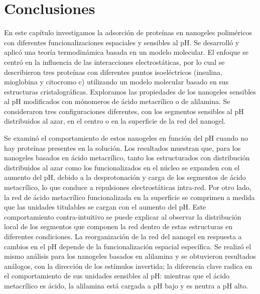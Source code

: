 \section{Conclusiones}


En este cap\'itulo investigamos la adsorci\'on de prote\'inas en nanogeles polim\'ericos con diferentes funcionalizaciones espaciales y sensibles al pH. Se desarroll\'o y aplic\'o una teor\'ia termodin\'amica basada en un modelo molecular.
El enfoque se centr\'o en la influencia de las interacciones electrost\'aticas, por lo cual se describieron tres prote\'inas con diferentes puntos isoel\'ectricos (insulina, mioglobina y citocromo c) utilizando un modelo molecular basado en sus estructuras cristalogr\'aficas.
Exploramos las propiedades de los nanogeles sensibles al pH modificados con m\'onomeros de  \'acido metacr\'ilico o de alilamina.
Se consideraron tres configuraciones diferentes, con los segmentos sensibles al pH distribuidos al azar, en el centro o en la superficie de la red del nanogel.

Se examin\'o el comportamiento de estos nanogeles en funci\'on del pH cuando no hay prote\'inas presentes en la soluci\'on.
Los resultados muestran que, para los nanogeles basados en \'acido metacr\'ilico, tanto los estructurados con distribuci\'on distribuidos al azar como los funcionalizados en el n\'ucleo se expanden con el aumento del pH, debido a la desprotonaci\'on y carga de los segmentos de \'acido metacr\'ilico, lo que conduce a repulsiones electrost\'aticas intra-red.
Por otro lado, la red de \'acido metacr\'ilico funcionalizada en la superficie se comprimen a medida que las unidades titulables se cargan con el aumento del pH.
Este comportamiento contra-intuitivo se puede explicar al observar la distribuci\'on local de los segmentos que componen la red dentro de estas estructuras en diferentes condiciones.
La reorganizaci\'on de la red del nanogel en respuesta a cambios en el pH depende de la funcionalizaci\'on espacial espec\'ifica.
Se realiz\'o el mismo an\'alisis para los nanogeles basados en alilamina y se obtuvieron resultados an\'alogos, con la direcci\'on de los est\'imulos invertida;
la diferencia clave radica en el comportamiento de sus unidades sensibles al pH: mientras que el \'acido metacr\'ilico es \'acido, la alilamina est\'a cargada a pH bajo y es neutra a pH alto.


